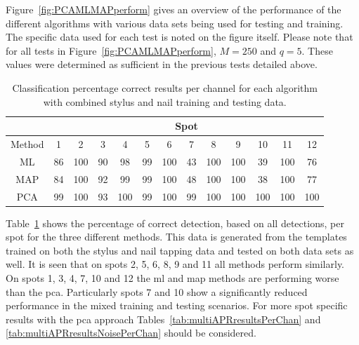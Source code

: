Figure~\ref{fig:PCAMLMAPperform} gives an overview of the performance of the different algorithms with various data sets being used for testing and training. The specific data used for each test is noted on the figure itself. Please note that for all tests in Figure~\ref{fig:PCAMLMAPperform}, $M=250$ and $q=5$. These values were determined as sufficient in the previous tests detailed above.\

\begin{table}\begin{center}
\caption{Classification percentage correct results per channel for each algorithm with combined stylus and nail training and testing data.}
\label{tab:APRresultsPerChan}
\begin{tabular}{|c|c|c|c|c|c|c|c|c|c|c|c|c|}\hline
  & \multicolumn{12}{|c|}{Spot} \\
\hline
Method  & 1   & 2     & 3    & 4     & 5    & 6     & 7     & 8      & 9     & 10    & 11    & 12   \\ \hline
ML      & 86  & 100   & 90   & 98    & 99   & 100   & 43    & 100    & 100   & 39    & 100   & 76   \\
MAP     & 84  & 100   & 92   & 99    & 99   & 100   & 48    & 100    & 100   & 38    & 100   & 77   \\
PCA     & 99  & 100   & 93   & 100   & 99   & 100   & 99    & 100    & 100   & 100   & 100   & 100   \\ \hline
\end{tabular}\end{center}\end{table}

Table~\ref{tab:APRresultsPerChan} shows the percentage of correct detection, based on all detections, per spot for the three different methods. This data is generated from the templates trained on both the stylus and nail tapping data and tested on both data sets as well. It is seen that on spots 2, 5, 6, 8, 9 and 11 all methods perform similarly. On spots 1, 3, 4, 7, 10 and 12 the \gls{ml} and \gls{map} methods are performing worse than the \gls{pca}. Particularly spots 7 and 10 show a significantly reduced performance in the mixed training and testing scenarios. For more spot specific results with the \gls{pca} approach Tables~\ref{tab:multiAPRresultsPerChan} and \ref{tab:multiAPRresultsNoisePerChan} should be considered.

